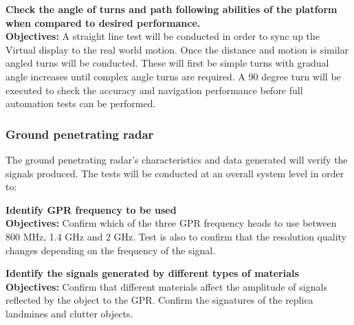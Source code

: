 \documentclass[main.tex]{subfiles}
\begin{document}
\begin{appendices}
\begin{qb}
\textbf{Check the angle of turns and path following abilities of the platform when compared to desired performance.}\\
\textbf{Objectives:} A straight line test will be conducted in order to sync up the Virtual display to the real world motion. Once the distance and motion is similar angled turns will be conducted. These will first be simple turns with gradual angle increases until complex angle turns are required. A 90 degree turn will be executed to check the accuracy and navigation performance before full automation tests can be performed.

\end{qb}


\subsubsection{Ground penetrating radar}
The ground penetrating radar’s characteristics and data generated will verify the signals produced. The tests will be conducted at an overall system level in order to:
\begin{gpr}
\textbf{Identify GPR frequency to be used}\\
\textbf{Objectives:} Confirm which of the three GPR frequency heads to use between 800 MHz, 1.4 GHz and 2 GHz. Test is also to confirm that the resolution quality changes depending on the frequency of the signal. 
\end{gpr}
\begin{gpr}
\textbf{Identify the signals generated by different types of materials}\\
\textbf{Objectives:} Confirm that different materials affect the amplitude of signals reflected by the object to the GPR. Confirm the signatures of the replica landmines and clutter objects.
\end{gpr}


\end{appendices}
\end{document}
